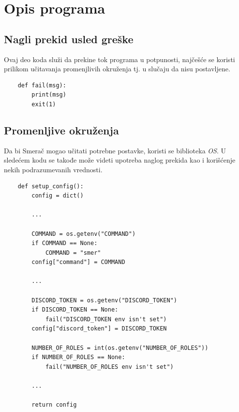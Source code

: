 \documentclass[a4paper,11pt]{article}
\begin{document}
\section{Opis programa}
\subsection{Nagli prekid usled greške}
Ovaj deo koda služi da prekine tok programa u potpunosti, najčešće se koristi prilikom učitavanja promenjlivih okruženja tj. u slučaju da nisu postavljene.
\begin{verbatim}
    def fail(msg):
        print(msg)
        exit(1)
\end{verbatim}
\subsection{Promenljive okruženja}
Da bi Smerač mogao učitati potrebne postavke, koristi se biblioteka \textit{OS}. U sledećem kodu se takođe može videti upotreba naglog prekida kao i korišćenje nekih podrazumevanih vrednosti.
\begin{verbatim}
    def setup_config():
        config = dict()

        ...

        COMMAND = os.getenv("COMMAND")
        if COMMAND == None:
            COMMAND = "smer"
        config["command"] = COMMAND

        ...

        DISCORD_TOKEN = os.getenv("DISCORD_TOKEN")
        if DISCORD_TOKEN == None:
            fail("DISCORD_TOKEN env isn't set")
        config["discord_token"] = DISCORD_TOKEN

        NUMBER_OF_ROLES = int(os.getenv("NUMBER_OF_ROLES"))
        if NUMBER_OF_ROLES == None:
            fail("NUMBER_OF_ROLES env isn't set")

        ...

        return config
\end{verbatim}
\newpage
\end{document}
